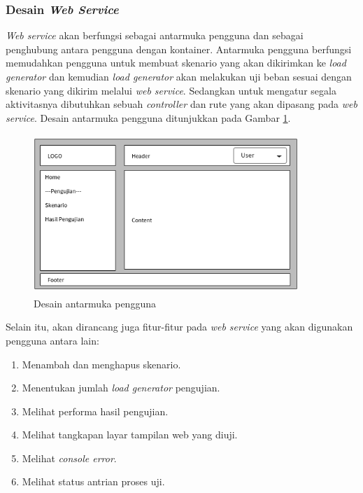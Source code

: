 	    	\subsubsection{Desain \textit{Web Service}}
	    		\textit{Web service} akan berfungsi sebagai antarmuka pengguna dan sebagai penghubung antara pengguna dengan kontainer. Antarmuka pengguna berfungsi memudahkan pengguna untuk membuat skenario yang akan dikirimkan ke \textit{load generator} dan kemudian \textit{load generator} akan melakukan uji beban sesuai dengan skenario yang dikirim melalui \textit{web service}. Sedangkan untuk mengatur segala aktivitasnya dibutuhkan sebuah \textit{controller} dan rute yang akan dipasang pada \textit{web service}. Desain antarmuka pengguna ditunjukkan pada Gambar \ref{mockupweb}.
	    		\begin{figure}[H]
	    			\centering
	    			\includegraphics[width=10cm,height=6cm]{Images/C-3/mockupweb.png}
	    			\caption{Desain antarmuka pengguna}
	    			\label{mockupweb}
	    		\end{figure}
	    	
		    	Selain itu, akan dirancang juga fitur-fitur pada \textit{web service} yang akan digunakan pengguna antara lain:
		    	\begin{enumerate}
		    		\item Menambah dan menghapus skenario.
		    		\item Menentukan jumlah \textit{load generator} pengujian.
		    		\item Melihat performa hasil pengujian.
		    		\item Melihat tangkapan layar tampilan web yang diuji.
		    		\item Melihat \textit{console error}.
		    		\item Melihat status antrian proses uji. \\
		    	\end{enumerate}
	    		
